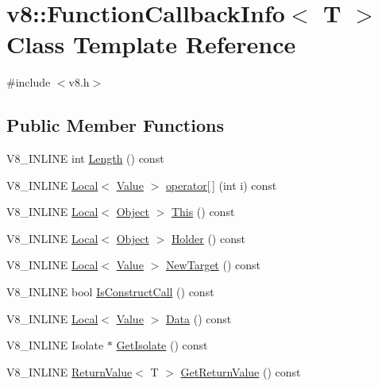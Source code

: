 \hypertarget{classv8_1_1FunctionCallbackInfo}{}\section{v8\+:\+:Function\+Callback\+Info$<$ T $>$ Class Template Reference}
\label{classv8_1_1FunctionCallbackInfo}


{\ttfamily \#include $<$v8.\+h$>$}

\subsection*{Public Member Functions}
\begin{DoxyCompactItemize}
\item 
V8\+\_\+\+I\+N\+L\+I\+NE int \mbox{\hyperlink{classv8_1_1FunctionCallbackInfo_af97dd3f1cb01ed039f9479152ad63a84}{Length}} () const
\item 
V8\+\_\+\+I\+N\+L\+I\+NE \mbox{\hyperlink{classv8_1_1Local}{Local}}$<$ \mbox{\hyperlink{classv8_1_1Value}{Value}} $>$ \mbox{\hyperlink{classv8_1_1FunctionCallbackInfo_a77dce5cad7b198c4181a522e9e0ab10f}{operator\mbox{[}$\,$\mbox{]}}} (int i) const
\item 
V8\+\_\+\+I\+N\+L\+I\+NE \mbox{\hyperlink{classv8_1_1Local}{Local}}$<$ \mbox{\hyperlink{classv8_1_1Object}{Object}} $>$ \mbox{\hyperlink{classv8_1_1FunctionCallbackInfo_a4ddfd6d21732dff1c4c55d5441a8a5ca}{This}} () const
\item 
V8\+\_\+\+I\+N\+L\+I\+NE \mbox{\hyperlink{classv8_1_1Local}{Local}}$<$ \mbox{\hyperlink{classv8_1_1Object}{Object}} $>$ \mbox{\hyperlink{classv8_1_1FunctionCallbackInfo_a708ab465862ed796e3b0b3c37ba05044}{Holder}} () const
\item 
V8\+\_\+\+I\+N\+L\+I\+NE \mbox{\hyperlink{classv8_1_1Local}{Local}}$<$ \mbox{\hyperlink{classv8_1_1Value}{Value}} $>$ \mbox{\hyperlink{classv8_1_1FunctionCallbackInfo_aa04f4c5c984db26a90b591f34550e6fa}{New\+Target}} () const
\item 
V8\+\_\+\+I\+N\+L\+I\+NE bool \mbox{\hyperlink{classv8_1_1FunctionCallbackInfo_ad2105b93e9b4d02f42b7338fa5950cbc}{Is\+Construct\+Call}} () const
\item 
V8\+\_\+\+I\+N\+L\+I\+NE \mbox{\hyperlink{classv8_1_1Local}{Local}}$<$ \mbox{\hyperlink{classv8_1_1Value}{Value}} $>$ \mbox{\hyperlink{classv8_1_1FunctionCallbackInfo_ab0ebfc2ea43af2fdfc3d085272bf499f}{Data}} () const
\item 
V8\+\_\+\+I\+N\+L\+I\+NE Isolate $\ast$ \mbox{\hyperlink{classv8_1_1FunctionCallbackInfo_a7eee713a6f95d5707ce788861754682f}{Get\+Isolate}} () const
\item 
V8\+\_\+\+I\+N\+L\+I\+NE \mbox{\hyperlink{classv8_1_1ReturnValue}{Return\+Value}}$<$ T $>$ \mbox{\hyperlink{classv8_1_1FunctionCallbackInfo_a2cb41afe1e098a46d27d901b4cc1e6f5}{Get\+Return\+Value}} () const
\end{DoxyCompactItemize}
